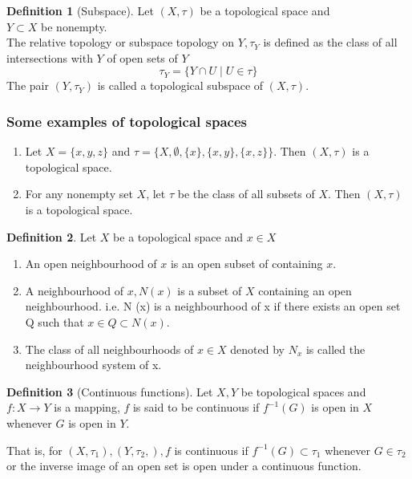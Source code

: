\documentclass[a4paper, 12pt]{scrartcl}
\theoremstyle{definition}
\newtheorem{defn}{Definition}[section]
\newcommand{\lra}{\longrightarrow}
\newcommand{\disp}{\displaystyle}
\begin{document}
    \begin{defn}[Subspace]
        Let $(X, \tau)$ be a topological space and\\
         $Y \subset X$ be nonempty.\\
        The relative topology or subspace topology on $Y, \tau_Y$ is defined as the class of all intersections with $Y$ of open sets of $Y$
        \[
            \tau_Y = \{Y \cap U  \mid U \in \tau\}
        \]
        The pair $(Y, \tau_Y)$ is called a topological subspace of $(X, \tau)$.
    \end{defn}

    \subsubsection*{Some examples of topological spaces}
    \begin{enumerate}
        \item Let $X = \{x,y,z\}$ and $\tau = \{X, \emptyset, \{x\}, \{x,y\}, \{x,z\}\}$. Then $(X, \tau)$ is a topological space.
        \item For any nonempty set $X$, let $\tau$ be the class of all  subsets of $X$. Then $(X, \tau)$ is a topological space.
    \end{enumerate}

    \begin{defn}
        Let $X$ be a topological space and $x \in X$ 
        \begin{enumerate}
            \item An open neighbourhood of $x$ is an open subset of containing $x$.
            \item A neighbourhood of $x, N(x)$ is a subset of $X$ containing an open neighbourhood. i.e. N (x) is a neighbourhood of x if there exists an open set Q such that $x \in Q \subset N (x)$.
            \item The class of all neighbourhoods of $x \in X$ denoted by $N_x$ is called the neighbourhood system of x.
        \end{enumerate}
    \end{defn}

    \begin{defn}[Continuous functions]
        Let $X,Y$ be topological spaces and \\
        $\disp f: X \lra Y$ is a mapping, $f$ is said to be continuous if $\disp f^{-1}(G)$ is open in $X$ whenever $G$ is open in $Y$.

        That is, for $(X, \tau_1),(Y, \tau_2,), f$ is continuous if $f^{-1} (G) \subset \tau_1$ whenever $G \in \tau_2$ or the inverse image of an open set is open under a continuous function.
    \end{defn}
\end{document}

